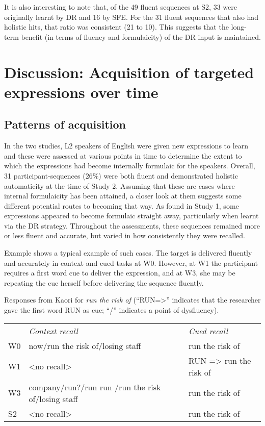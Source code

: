 \documentclass[output=paper]{langscibook}
\begin{document}
It is also interesting to note that, of the 49 fluent sequences at S2, 33 were originally learnt by DR and 16 by SFE. For the 31 fluent sequences that also had holistic hits, that ratio was consistent (21 to 10). This suggests that the long-term benefit (in terms of fluency and formulaicity) of the DR input is maintained. 

\section{Discussion: Acquisition of targeted expressions over time}
\subsection{Patterns of acquisition}

In the two studies, L2 speakers of English were given new expressions to learn and these were assessed at various points in time to determine the extent to which the expressions had become internally formulaic for the speakers. Overall, 31 participant-sequences (26\%) were both fluent and demonstrated holistic automaticity at the time of Study 2. Assuming that these are cases where internal formulaicity has been attained, a closer look at them suggests some different potential routes to becoming that way. As found in Study 1, some expressions appeared to become formulaic straight away, particularly when learnt via the DR strategy. Throughout the assessments, these sequences remained more or less fluent and accurate, but varied in how consistently they were recalled. 

Example  shows a typical example of such cases. The target is delivered fluently and accurately in context and cued tasks at W0. However, at W1 the participant requires a first word cue to deliver the expression, and at W3, she may be repeating the cue herself before delivering the sequence fluently.


\ea Responses from Kaori for \textit{run the risk of} (``RUN=>'' indicates that the researcher gave the first word RUN as cue; ``/'' indicates a point of dysfluency).\smallskip\\\label{ex:cutler:2}
\begin{tabularx}{\linewidth}{@{}lQQ@{}}
& {\itshape Context recall} & {\itshape Cued recall}\\
W0 & now\slash run the risk of\slash losing staff & run the risk of\\
W1 & <no recall> & RUN => run the risk of\\
W3 & company\slash run?\slash run run /run the risk of\slash losing staff & run the risk of\\
S2 & <no recall> & run the risk of\\
\end{tabularx}
\z
\end{document}
